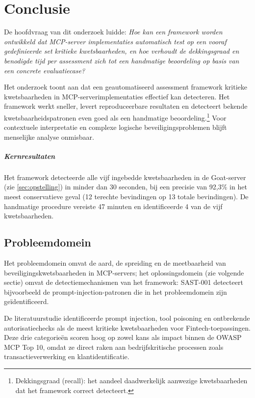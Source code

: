 
\chapter{Conclusie}%
\label{ch:conclusie}

De hoofdvraag van dit onderzoek luidde: \emph{Hoe kan een framework worden ontwikkeld dat MCP-server implementaties automatisch test op een vooraf gedefinieerde set kritieke kwetsbaarheden, en hoe verhoudt de dekkingsgraad en benodigde tijd per assessment zich tot een handmatige beoordeling op basis van een concrete evaluatiecase?}

Het onderzoek toont aan dat een geautomatiseerd assessment framework kritieke kwetsbaarheden in MCP-serverimplementaties effectief kan detecteren. Het framework werkt sneller, levert reproduceerbare resultaten en detecteert bekende kwetsbaarheidspatronen even goed als een handmatige beoordeling.\footnote{Dekkingsgraad (recall): het aandeel daadwerkelijk aanwezige kwetsbaarheden dat het framework correct detecteert.} Voor contextuele interpretatie en complexe logische beveiligingsproblemen blijft menselijke analyse onmisbaar.

\paragraph{Kernresultaten}
Het framework detecteerde alle vijf ingebedde kwetsbaarheden in de Goat-server (zie \ref{sec:opstelling}) in minder dan 30 seconden, bij een precisie van 92{,}3\% in het meest conservatieve geval (12 terechte bevindingen op 13 totale bevindingen). De handmatige procedure vereiste 47 minuten en identificeerde 4 van de vijf kwetsbaarheden.

\section{Probleemdomein}

Het probleemdomein omvat de aard, de spreiding en de meetbaarheid van beveiligingskwetsbaarheden in MCP-servers; het oplossingsdomein (zie volgende sectie) omvat de detectiemechanismen van het framework: SAST-001 detecteert bijvoorbeeld de prompt-injection-patronen die in het probleemdomein zijn geïdentificeerd.

De literatuurstudie identificeerde prompt injection, tool poisoning en ontbrekende autorisatiechecks als de meest kritieke kwetsbaarheden voor Fintech-toepassingen. Deze drie categorieën scoren hoog op zowel kans als impact binnen de OWASP MCP Top 10, omdat ze direct raken aan bedrijfskritische processen zoals transactieverwerking en klantidentificatie.

